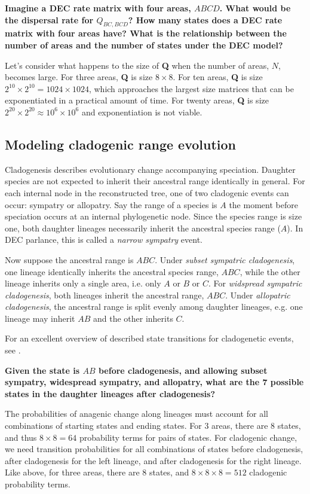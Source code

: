 { \bf {} Imagine a DEC rate matrix with four areas, $ABCD$. What would be the dispersal rate for $Q_{BC,BCD}$? How many states does a DEC rate matrix with four areas have? What is the relationship between the number of areas and the number of states under the DEC model? }

Let's consider what happens to the size of \textbf{Q} when the number of areas, $N$, becomes large.
For three areas, \textbf{Q} is size $8 \times 8$.
For ten areas, \textbf{Q} is size $2^{10} \times 2^{10} = 1024 \times 1024$, which approaches the largest size matrices that can be exponentiated in a practical amount of time.
For twenty areas, \textbf{Q} is size $2^{20} \times 2^{20} \approx 10^6 \times 10^6$ and exponentiation is not viable.


\subsection{Modeling cladogenic range evolution}

Cladogenesis describes evolutionary change accompanying speciation.
Daughter species are not expected to inherit their ancestral range identically in general.
For each internal node in the reconstructed tree, one of two cladogenic events can occur: sympatry or allopatry.
Say the range of a species is $A$ the moment before speciation occurs at an internal phylogenetic node.
Since the species range is size one, both daughter lineages necessarily inherit the ancestral species range ($A$).
In DEC parlance, this is called a {\it narrow sympatry} event.

Now suppose the ancestral range is $ABC$.
Under {\it subset sympatric cladogenesis}, one lineage identically inherits the ancestral species range, $ABC$, while the other lineage inherits only a single area, i.e. only $A$ or $B$ or $C$.
For {\it widspread sympatric cladogenesis}, both lineages inherit the ancestral range, $ABC$.
Under {\it allopatric cladogenesis}, the ancestral range is split evenly among daughter lineages, e.g. one lineage may inherit $AB$ and the other inherits $C$.

For an excellent overview of described state transitions for cladogenetic events, see \citet{Matzke2012}.

{\bf {} Given the state is $AB$ before cladogenesis, and allowing subset sympatry, widespread sympatry, and allopatry, what are the 7 possible states in the daughter lineages after cladogenesis?}

The probabilities of anagenic change along lineages must account for all combinations of starting states and ending states.
For 3 areas, there are 8 states, and thus $8 \times 8 = 64$ probability terms for pairs of states.
For cladogenic change, we need transition probabilities for all combinations of states before cladogenesis, after cladogenesis for the left lineage, and after cladogenesis for the right lineage.
Like above, for three areas, there are 8 states, and $8 \times 8 \times 8 = 512$ cladogenic probability terms.

